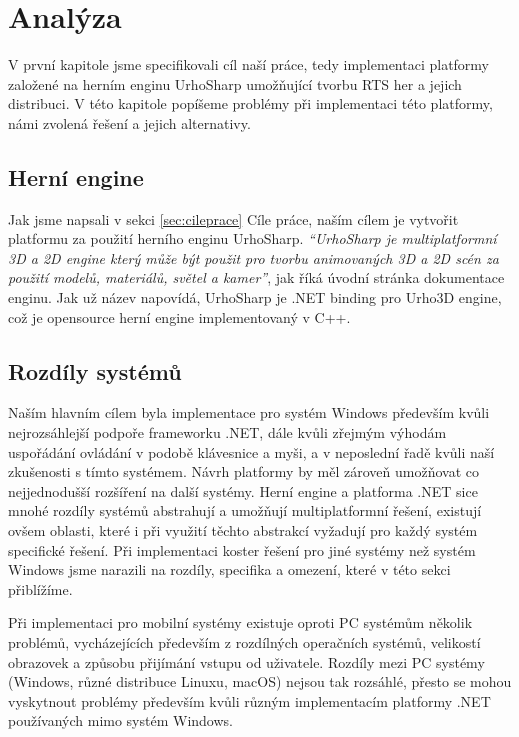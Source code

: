 \chapter{Analýza}
V první kapitole jsme specifikovali cíl naší práce, tedy implementaci platformy založené na herním enginu UrhoSharp umožňující tvorbu RTS her a jejich distribuci. V této kapitole popíšeme problémy při implementaci této platformy, námi zvolená řešení a jejich alternativy.

\section{Herní engine}
Jak jsme napsali v sekci \ref{sec:cileprace} Cíle práce, naším cílem je vytvořit platformu za použití herního enginu UrhoSharp. \textit{``UrhoSharp je multiplatformní 3D a 2D engine který může být použit pro tvorbu animovaných 3D a 2D scén za použití modelů, materiálů, světel a kamer''}\citep{site:urhosharp}, jak říká úvodní stránka dokumentace enginu. Jak už název napovídá, UrhoSharp je .NET binding pro Urho3D engine\citep{site:urho3D}, což je opensource herní engine implementovaný v C++.


\section{Rozdíly systémů}
Naším hlavním cílem byla implementace pro systém Windows především kvůli nejrozsáhlejší podpoře frameworku .NET, dále kvůli zřejmým výhodám uspořádání ovládání v podobě klávesnice a myši, a v neposlední řadě kvůli naší zkušenosti s tímto systémem. Návrh platformy by měl zároveň umožňovat co nejjednodušší rozšíření na další systémy. Herní engine a platforma .NET sice mnohé rozdíly systémů abstrahují a umožňují multiplatformní řešení, existují ovšem oblasti, které i při využití těchto abstrakcí vyžadují pro každý systém specifické řešení. Při implementaci koster řešení pro jiné systémy než systém Windows jsme narazili na rozdíly, specifika a omezení, které v této sekci přiblížíme. 

Při implementaci pro mobilní systémy existuje oproti PC systémům několik problémů, vycházejících především z rozdílných operačních systémů, velikostí obrazovek a způsobu přijímání vstupu od uživatele. Rozdíly mezi PC systémy (Windows, různé distribuce Linuxu, macOS) nejsou tak rozsáhlé, přesto se mohou vyskytnout problémy především kvůli různým implementacím platformy .NET používaných mimo systém Windows.

